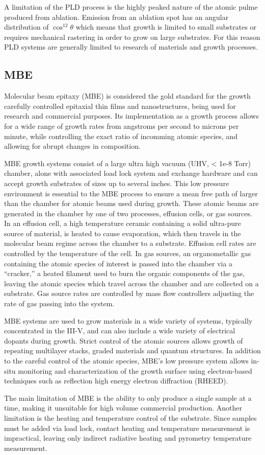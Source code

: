 A limitation of the PLD process is the highly peaked nature of the atomic pulme produced from ablation. Emission from an ablation spot has an angular distribution of $\cos^12{\theta}$ which means that growth is limited to small substrates or requires mechanical rastering in order to grow on large substrates. For this reason PLD systems are generally limited to research of materials and growth processes.

\subsection{MBE}
Molecular beam epitaxy (MBE) is considered the gold standard for the growth carefully controlled epitaxial thin films and nanostructures, being used for research and commercial purposes. Its implementation as a growth process allows for a wide range of growth rates from angstroms per second to microns per minute, while controlling the exact ratio of incomming atomic species, and allowing for abrupt changes in composition.

MBE growth systems consist of a large ultra high vacuum (UHV, < 1e-8 Torr) chamber, alone with associated load lock system and exchange hardware and can accept growth substrates of sizes up to several inches. This low pressure environment is essential to the MBE process to ensure a mean free path of larger than the chamber for atomic beams used during growth. These atomic beams are generated in the chamber by one of two processes, effusion cells, or gas sources. In an effusion cell, a high temperature ceramic containing a solid ultra-pure source of material, is heated to cause evaporation, which then travels in the molecular beam regime across the chamber to a substrate. Effusion cell rates are controlled by the temperature of the cell. In gas sources, an organometallic gas containing the atomic species of interest is passed into the chamber via a ``cracker,'' a heated filament used to burn the organic components of the gas, leaving the atomic species which travel across the chamber and are collected on a substrate. Gas source rates are controlled by mass flow controllers adjusting the rate of gas passing into the system.

MBE systems are used to grow materials in a wide variety of systems, typically concentrated in the III-V, and can also include a wide variety of electrical dopants during growth. Strict control of the atomic sources allows growth of repeating multilayer stacks, graded materials and quantum structures. In addition to the careful control of the atomic species, MBE's low pressure system allows in-situ monitoring and characterization of the growth surface using electron-based techniques such as reflection high energy electron diffraction (RHEED).

The main limitation of MBE is the ability to only produce a single sample at a time, making it unsuitable for high volume commercial production. Another limitation is the heating and temperature control of the substrate. Since samples must be added via load lock, contact heating and temperature measurement is impractical, leaving only indirect radiative heating and pyrometry temperature measurement.